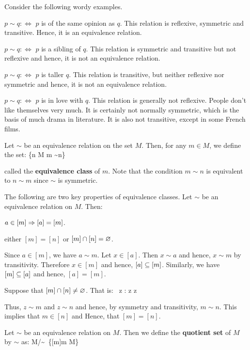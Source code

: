 \be
Consider the following wordy examples.
\ben[label=\alph*)]
\item $p\sim q :\Leftrightarrow $ $p$ is of the same opinion as $q$. This relation is reflexive, symmetric and
transitive. Hence, it is an equivalence relation.
\item $p\sim q :\Leftrightarrow $ $p$ is a sibling of $q$. This relation is symmetric and transitive but not reflexive
and hence, it is not an equivalence relation.
\item $p\sim q :\Leftrightarrow $ $p$ is taller $q$. This relation is transitive, but neither reflexive nor symmetric
and hence, it is not an equivalence relation.
\item $p\sim q :\Leftrightarrow $ $p$ is in love with $q$. This relation is generally not reflexive. People don't like
themselves very much. It is certainly not normally symmetric, which is the basis of much drama in literature. It is also
not transitive, except in some French films.
\een
\ee

Let $\sim$ be an equivalence relation on the set $M$. Then, for any $m \in M$, we define the set:
\bse
[m] \coloneqq \{n \in M \mid m \sim n\}
\ese

called the \textbf{equivalence class} of $m$. Note that the condition $m \sim n$ is equivalent to $n \sim m$ since
$\sim$ is symmetric.
\ed

The following are two key properties of equivalence classes.
\bt[]
Let $\sim$ be an equivalence relation on $M$. Then:
\ben
\item[i)] $a \in [m] \Rightarrow [a]=[m]$.
\item[ii)] either $[m]=[n]$ or $[m] \cap [n] = \varnothing$.
\een
\et

\bq
\ben
\item[i)] Since $a\in[m]$, we have $a\sim m$. Let $x \in [a]$. Then $x \sim a$ and hence, $x \sim m$ by transitivity.
Therefore $x \in [m]$ and hence, $[a]\subseteq[m]$. Similarly, we have $[m]\subseteq[a]$ and hence, $[a]=[m]$.
\item[ii)] Suppose that $[m]\cap[n]\neq\varnothing$. That is:
\bse
\exists \, z : z \in [m] \land z \in [n]
\ese

Thus, $z \sim m$ and $z \sim n$ and hence, by symmetry and transitivity, $m \sim n$. This implies that $m \in [n]$ and
Hence, that $[m] = [n]$. \qedhere
\een
\eq

Let $\sim$ be an equivalence relation on $M$. Then we define the \textbf{quotient set} of $M$ by $\sim$ as:
\bse
M/\!\sim\ \coloneqq \{[m]\mid m \in M\}
\ese

